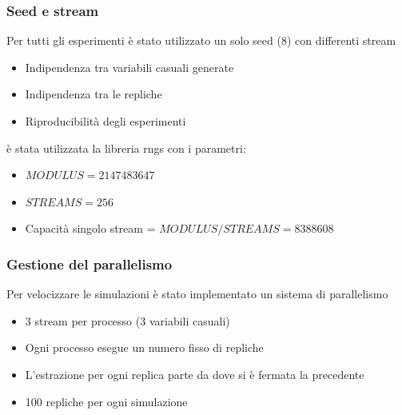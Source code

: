 \subsubsection{Seed e stream}
\begin{frame}{\subsubsecname}
    Per tutti gli esperimenti è stato utilizzato un solo seed (8) con differenti stream
    \begin{itemize}
        \item Indipendenza tra variabili casuali generate
        \item Indipendenza tra le repliche
        \item Riproducibilità degli esperimenti
    \end{itemize}

    \begin{block}{}
        è stata utilizzata la libreria rngs con i parametri:
        \begin{itemize}
            \item \(MODULUS = 2147483647\)
            \item \(STREAMS = 256\)
            \item Capacità singolo stream = \(MODULUS / STREAMS = 8388608\)
        \end{itemize}
    \end{block}
\end{frame}

\subsubsection{Gestione del parallelismo}
\begin{frame}{\subsubsecname}
    Per velocizzare le simulazioni è stato implementato un sistema di parallelismo
    \begin{itemize}
        \item 3 stream per processo (3 variabili casuali)
        \item Ogni processo esegue un numero fisso di repliche
        \item L'estrazione per ogni replica parte da dove si è fermata la precedente
        \item 100 repliche per ogni simulazione
    \end{itemize}   
\end{frame}